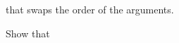 \begin{exercises}
\begin{subexenum}
    that swaps the order of the arguments.
  \item Show that
  \end{subexenum}
  \vspace{-.5\baselineskip}
  \begin{small}
    \begin{prooftree}
    \end{prooftree}
  \end{small}
\end{exercises}

